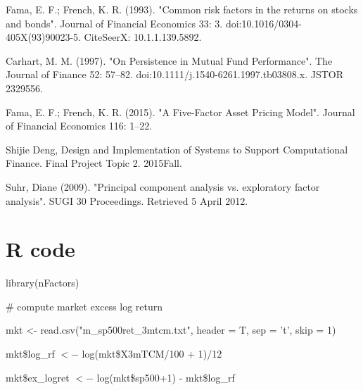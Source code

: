 \documentclass[10pt, conference]{IEEEtran}
\begin{document}
%
%
%
\begin{thebibliography}{3}

Fama, E. F.; French, K. R. (1993). "Common risk factors in the returns on stocks and bonds". Journal of Financial Economics 33: 3. doi:10.1016/0304-405X(93)90023-5. CiteSeerX: 10.1.1.139.5892.

Carhart, M. M. (1997). "On Persistence in Mutual Fund Performance". The Journal of Finance 52: 57–82. doi:10.1111/j.1540-6261.1997.tb03808.x. JSTOR 2329556.

Fama, E. F.; French, K. R. (2015). "A Five-Factor Asset Pricing Model". Journal of Financial Economics 116: 1–22.

Shijie Deng, Design and Implementation of Systems to Support Computational Finance. Final Project Topic 2. 2015Fall. 

Suhr, Diane (2009). "Principal component analysis vs. exploratory factor analysis". SUGI 30 Proceedings. Retrieved 5 April 2012.

\end{thebibliography}

\newpage
\appendices

\setcounter{figure}{0}
\setcounter{table}{0}  

\onecolumn
\section{R code}

library(nFactors)

\# compute market excess log return

mkt <- read.csv("m\_sp500ret\_3mtcm.txt", header = T, sep = 't', skip = 1)

mkt\$log\_rf $<-$ log(mkt\$X3mTCM/100 + 1)/12

mkt\$ex\_logret $<-$ log(mkt\$sp500+1) - mkt\$log\_rf
\end{document}
